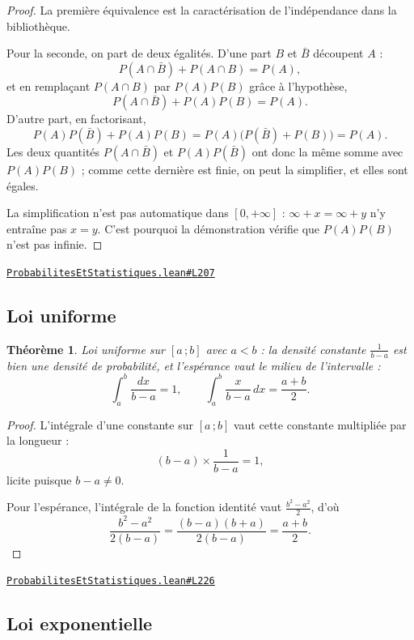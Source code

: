 \documentclass[11pt,a4paper]{article}
\theoremstyle{definition}
\theoremstyle{plain}
\newtheorem{theoreme}{Théorème}
\newcommand{\source}[2]{\par\smallskip\noindent\hfill{\footnotesize\href{#1}{\texttt{#2}}}\par\smallskip}
\begin{document}
\begin{proof}
La première équivalence est la caractérisation de l'indépendance dans la bibliothèque.

Pour la seconde, on part de deux égalités. D'une part $B$ et $\bar B$ découpent $A$ :
\[ P(A \cap \bar B) + P(A \cap B) = P(A) , \]
et en remplaçant $P(A \cap B)$ par $P(A)P(B)$ grâce à l'hypothèse,
\[ P(A \cap \bar B) + P(A)P(B) = P(A) . \]
D'autre part, en factorisant,
\[ P(A)P(\bar B) + P(A)P(B) = P(A)\bigl(P(\bar B) + P(B)\bigr) = P(A) . \]
Les deux quantités $P(A \cap \bar B)$ et $P(A)P(\bar B)$ ont donc la même somme avec
$P(A)P(B)$ ; comme cette dernière est finie, on peut la simplifier, et elles sont égales.

\medskip\noindent
La simplification n'est pas automatique dans $[0, +\infty]$ : $\infty + x = \infty + y$ n'y
entraîne pas $x = y$. C'est pourquoi la démonstration vérifie que $P(A)P(B)$ n'est pas
infinie.
\end{proof}
\source{https://github.com/Commutator-IO/learn-lean/blob/main/courses/02-lycee/09-probabilites-et-statistiques/ProbabilitesEtStatistiques.lean\#L207}{ProbabilitesEtStatistiques.lean\#L207}

\subsection{Loi uniforme}

\begin{theoreme}
Loi uniforme sur $[a\,;b]$ avec $a < b$ : la densité constante $\frac{1}{b-a}$ est bien
une densité de probabilité, et l'espérance vaut le milieu de l'intervalle :
\[ \int_a^b \frac{dx}{b-a} = 1 , \qquad
   \int_a^b \frac{x}{b-a}\,dx = \frac{a+b}{2} . \]
\end{theoreme}

\begin{proof}
L'intégrale d'une constante sur $[a\,;b]$ vaut cette constante multipliée par la longueur :
\[ (b - a) \times \frac{1}{b-a} = 1 , \]
licite puisque $b - a \ne 0$.

Pour l'espérance, l'intégrale de la fonction identité vaut $\frac{b^{2}-a^{2}}{2}$, d'où
\[ \frac{b^{2}-a^{2}}{2(b-a)} = \frac{(b-a)(b+a)}{2(b-a)} = \frac{a+b}{2} . \]
\end{proof}
\source{https://github.com/Commutator-IO/learn-lean/blob/main/courses/02-lycee/09-probabilites-et-statistiques/ProbabilitesEtStatistiques.lean\#L226}{ProbabilitesEtStatistiques.lean\#L226}

\subsection{Loi exponentielle}
\end{document}
